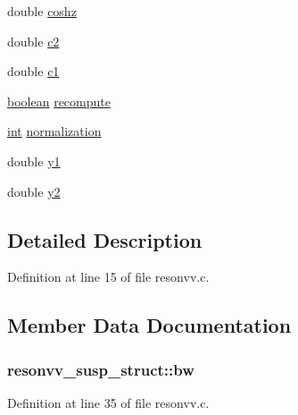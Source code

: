 \begin{DoxyCompactItemize}
\item 
double \hyperlink{structresonvv__susp__struct_a01d1a5527cb0608b1314002d356be055}{coshz}
\item 
double \hyperlink{structresonvv__susp__struct_a288a80ddca6231cd8b2f768d17a65aa3}{c2}
\item 
double \hyperlink{structresonvv__susp__struct_a07ffa92403ff7ad431bcb8728a5dfc57}{c1}
\item 
\hyperlink{cext_8h_a7670a4e8a07d9ebb00411948b0bbf86d}{boolean} \hyperlink{structresonvv__susp__struct_a43427b950ce219645aec4a68f19f02af}{recompute}
\item 
\hyperlink{xmltok_8h_a5a0d4a5641ce434f1d23533f2b2e6653}{int} \hyperlink{structresonvv__susp__struct_a47f5c2a3ee51083007b207ffd4df1f44}{normalization}
\item 
double \hyperlink{structresonvv__susp__struct_a2efea96c37834db1cf1445bcf7a60700}{y1}
\item 
double \hyperlink{structresonvv__susp__struct_ad3c3b47b81614a8748ec59077528f5a2}{y2}
\end{DoxyCompactItemize}


\subsection{Detailed Description}


Definition at line 15 of file resonvv.\+c.



\subsection{Member Data Documentation}
\subsubsection[{\texorpdfstring{bw}{bw}}]{ resonvv\+\_\+susp\+\_\+struct\+::bw}\hypertarget{structresonvv__susp__struct_a62e43d691251666dd80f7f0c257ba8c1}{}\label{structresonvv__susp__struct_a62e43d691251666dd80f7f0c257ba8c1}


Definition at line 35 of file resonvv.\+c.

